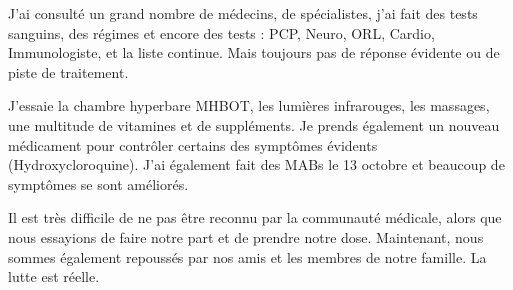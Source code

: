 J'ai consulté un grand nombre de médecins, de spécialistes, j'ai fait des tests
sanguins, des régimes et encore des tests : PCP, Neuro, ORL, Cardio,
Immunologiste, et la liste continue. Mais toujours pas de réponse évidente ou de
piste de traitement.

J'essaie la chambre hyperbare MHBOT, les lumières infrarouges, les massages, une
multitude de vitamines et de suppléments. Je prends également un nouveau
médicament pour contrôler certains des symptômes évidents
(Hydroxycloroquine). J'ai également fait des MABs le 13 octobre et beaucoup de
symptômes se sont améliorés.

Il est très difficile de ne pas être reconnu par la communauté médicale, alors
que nous essayions de faire notre part et de prendre notre dose. Maintenant,
nous sommes également repoussés par nos amis et les membres de notre famille. La
lutte est réelle.
